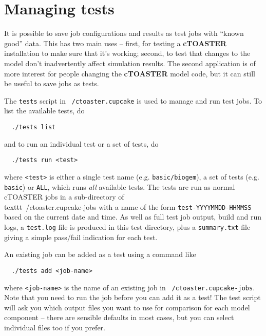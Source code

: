 \documentclass[a4paper,10pt,article]{memoir}
\begin{document}
\section{Managing tests}

It is possible to save job configurations and results as test jobs
with ``known good'' data.  This has two main uses -- first, for
testing a \textbf{cTOASTER} installation to make sure that it's working; second,
to test that changes to the model don't inadvertently affect
simulation results.  The second application is of more interest for
people changing the \textbf{cTOASTER} model code, but it can still be useful to
save jobs as tests.

The \texttt{tests} script in \texttt{~/ctoaster.cupcake} is used to manage and
run test jobs.  To list the available tests, do
\begin{verbatim}
  ./tests list
\end{verbatim}
and to run an individual test or a set of tests, do
\begin{verbatim}
  ./tests run <test>
\end{verbatim}
where \texttt{<test>} is either a single test name (e.g.
\texttt{basic/biogem}), a set of tests (e.g. \texttt{basic}) or
\texttt{ALL}, which runs \emph{all} available tests.  The tests are
run as normal cTOASTER jobs in a sub-directory of \
\\texttt{~/ctoaster.cupcake-jobs}
with a name of the form \texttt{test-YYYYMMDD-HHMMSS} based on the
current date and time.  As well as full test job output, build and run
logs, a \texttt{test.log} file is produced in this test directory,
plus a \texttt{summary.txt} file giving a simple pass/fail indication
for each test.

An existing job can be added as a test using a command like
\begin{verbatim}
  ./tests add <job-name>
\end{verbatim}
where \texttt{<job-name>} is the name of an existing job in
\texttt{~/ctoaster.cupcake-jobs}.  Note that you need to run the job before you
can add it as a test!  The test script will ask you which output files
you want to use for comparison for each model component -- there are
sensible defaults in most cases, but you can select individual files
too if you prefer.
\end{document}
